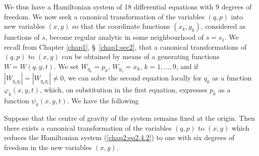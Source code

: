 We thus have a Hamiltonian system of 18 differential equations with 9 degrees of freedom. We now seek a canonical transformation of the variables $(q,p)$ into new variables $(x,y)$ so that the coordinate functions $(x_k, y_k)$, considered as functions of $s$, become regular analytic in some neighbourhood of $s = s_1$. We recall from Chapter \ref{chap1}, \S\ \ref{chap1:sec2}, that a canonical transformations of $(q,p)$ to $(x,y)$ can be obtained by means of a generating functions $W = W(q,y,t)$. We set $W_{q_k} = p_k$, $W_{y_k} = x_k$, $k = 1, \ldots, 9$, and if $|W_{y_k q_l}| = |W_{q_k y_l}| \neq 0$, we can solve the second equation locally for $q_k$ as a function $\varphi_k (x,y,t)$, which, on substitution in the first equation, expresses $p_k$ as a function $\psi_k(x,y,t)$. We have the following

\setcounter{subtheorem}{0}
\begin{subtheorem}\label{chap2:thm2.4.1}
Suppose that the centre of gravity of the system remains fixed at the origin. Then there exists a canonical transformation of the variables $(q,p)$ to $(x,y)$ which reduces the Hamiltonian system (\ref{chap2:eq2.4.2}) to one with six degrees of freedom in the new variables $(x,y)$.
\end{subtheorem}

